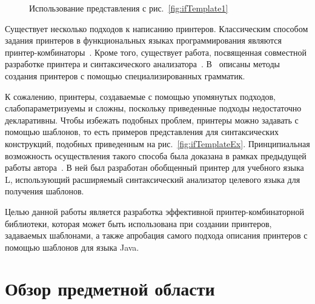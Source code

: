 \begin{figure}[h!]
\centering
	\subfloat[]{
		\centering
		\texttt{[image: if2]}
		\label{fig:ifImage2}
	}
	\quad
	\subfloat[]{
		\centering
		
		\label{fig:ifCode2}	
	}

	\caption{Использование представления с рис.~\ref{fig:ifTemplate1}}
\end{figure}

Существует несколько подходов к написанию принтеров.
Классическим способом задания принтеров в функциональных языках
программирования являются
принтер-комбинаторы~\cite{wadler, swierstra, swierstraChitil,
swierstra04, hughes, peytonJones, kiselyov, chitil, swiComb}.
Кроме того, существует работа, посвященная совместной разработке
принтера и синтаксического анализатора~\cite{rendelInvert}.
В~\cite{jongeEveryOccasion, jongeReengine, brandBox} описаны методы
создания принтеров с помощью специализированных грамматик.

К сожалению, принтеры, создаваемые с помощью упомянутых подходов,
слабопараметризуемы и сложны, поскольку приведенные
подходы недостаточно декларативны. Чтобы избежать подобных проблем,
принтеры можно задавать с помощью шаблонов, то есть примеров представления для
синтаксических конструкций, подобных приведенным на рис.~\ref{fig:ifTemplateEx}.
Принципиальная возможность
осуществления такого способа была доказана в рамках предыдущей работы
автора~\cite{CoursePaper}. В ней был разработан
обобщенный принтер для учебного языка L, использующий расширяемый
синтаксический анализатор целевого языка для получения шаблонов.


Целью данной работы является разработка эффективной принтер-комбинаторной
библиотеки, которая может быть использована при создании принтеров, задаваемых
шаблонами, а также апробация самого подхода описания принтеров с помощью
шаблонов для языка Java.

\section{Обзор предметной области}

